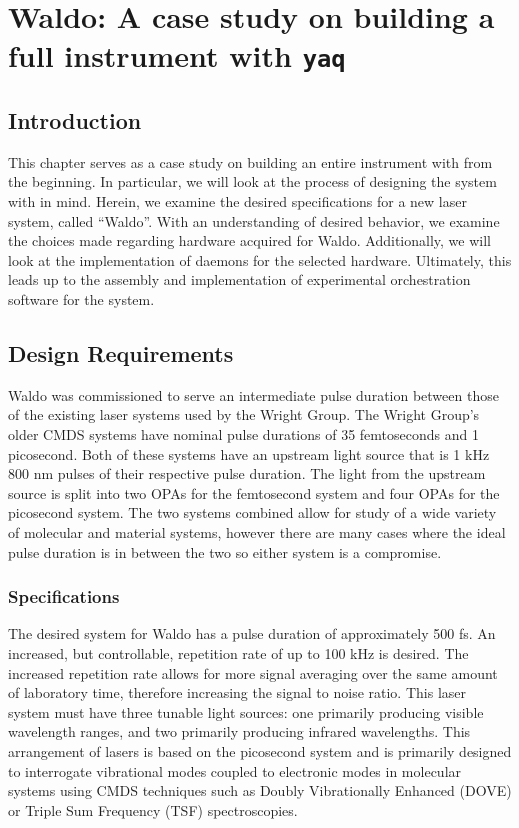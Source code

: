 \chapter{Waldo: A case study on building a full instrument with \texttt{yaq}} \label{cha:waldo}

\clearpage

\section{Introduction}  %

This chapter serves as a case study on building an entire instrument with \yaq{} from the beginning.
In particular, we will look at the process of designing the system with \yaq{} in mind.
Herein, we examine the desired specifications for a new laser system, called ``Waldo''.
With an understanding of desired behavior, we examine the choices made regarding hardware acquired for Waldo.
Additionally, we will look at the implementation of \yaq{} daemons for the selected hardware.
Ultimately, this leads up to the assembly and implementation of experimental orchestration software for the system.


\clearpage

\section{Design Requirements}  %

Waldo was commissioned to serve an intermediate pulse duration between those of the existing laser systems used by the Wright Group.
The Wright Group's older CMDS systems have nominal pulse durations of 35 femtoseconds and 1 picosecond.
Both of these systems have an upstream light source that is 1 kHz 800 nm pulses of their respective pulse duration.
The light from the upstream source is split into two OPAs for the femtosecond system and four OPAs for the picosecond system.
The two systems combined allow for study of a wide variety of molecular and material systems, however there are many cases where the ideal pulse duration is in between the two so either system is a compromise.

\subsection{Specifications}

The desired system for Waldo has a pulse duration of approximately 500 fs.
An increased, but controllable, repetition rate of up to 100 kHz is desired.
The increased repetition rate allows for more signal averaging over the same amount of laboratory time, therefore increasing the signal to noise ratio.
This laser system must have three tunable light sources: one primarily producing visible wavelength ranges, and two primarily producing infrared wavelengths.
This arrangement of lasers is based on the picosecond system and is primarily designed to interrogate vibrational modes coupled to electronic modes in molecular systems using CMDS techniques such as Doubly Vibrationally Enhanced (DOVE) or Triple Sum Frequency (TSF) spectroscopies.


